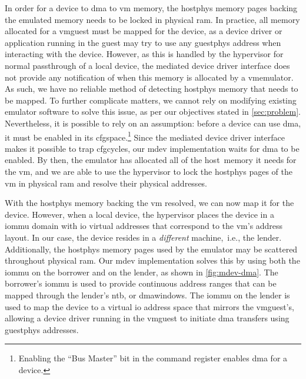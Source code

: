 In order for a device to \gls{dma} to \gls{vm} memory, the \gls{hostphys} memory pages backing the emulated memory needs to be locked in physical \gls{ram}.
%
In practice, all memory allocated for a \gls{vmguest} must be mapped for the device, as a device driver or application running in the \gls{guest} may try to use any \gls{guestphys} address when interacting with the device.
%
However, as this is handled by the \gls{hypervisor} for normal \gls{passthrough} of a local device, the mediated device driver interface does not provide any notification of when this memory is allocated by a \gls{vmemulator}.
%
As such, we have no reliable method of detecting \gls{hostphys} memory that needs to be mapped. %
%
To further complicate matters, we cannot rely on modifying existing \gls{emulator} software to solve this issue, as per our objectives stated in \cref{sec:problem}.
%
Nevertheless, it is possible to rely on an assumption:
%
before a device can use \gls{dma}, it must be enabled in its \gls{cfgspace}.\footnote{Enabling the ``Bus Master'' bit in the command register enables \gls{dma} for a device.}
%
Since the mediated device driver interface makes it possible to \gls{trap} \glspl{cfgcycle}, our \gls{mdev} implementation waits for \gls{dma} to be enabled.
%
By then, the \gls{emulator} has allocated all of the \gls{host}~memory it needs for the \gls{vm}, and we are able to use the \gls{hypervisor} to lock the \gls{hostphys} pages of the \gls{vm} in physical \gls{ram} and resolve their physical addresses.



With the \gls{hostphys} memory backing the \gls{vm} resolved, we can now map it for the device.
%
However, when  a local device, the \gls{hypervisor} places the device in a \gls{iommu} domain with \gls{io} virtual addresses that correspond to the \gls{vm}'s address layout.
%
In our case, the device resides in a \emph{different} machine,~i.e., the \gls{lender}.
%
Additionally, the \gls{hostphys} memory pages used by the \gls{emulator} may be scattered throughout physical \gls{ram}.
%
Our \gls{mdev} implementation solves this by using both the \gls{iommu} on the \gls{borrower} and on the \gls{lender}, as shown in \cref{fig:mdev-dma}.
%
The \gls{borrower}'s \gls{iommu} is used to provide continuous address ranges that can be mapped through the \gls{lender}'s \gls{ntb}, or \glspl{dmawindow}.
%
The \gls{iommu} on the \gls{lender} is used to map the device to a virtual \gls{io} address space that mirrors the \gls{vmguest}'s, allowing a device driver running in the \gls{vmguest} to initiate \gls{dma} transfers using \gls{guestphys} addresses.



